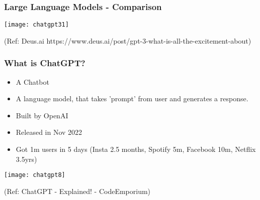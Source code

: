 



\begin{frame}[fragile]\frametitle{Large Language Models - Comparison}

\begin{center}
\texttt{[image: chatgpt31]}
\end{center}				
{\tiny (Ref: Deus.ai https://www.deus.ai/post/gpt-3-what-is-all-the-excitement-about)}

\end{frame}



\begin{frame}[fragile]\frametitle{What is ChatGPT?}


\begin{itemize}
\item A Chatbot
\item A language model, that takes 'prompt' from user and generates a response.
\item Built by OpenAI
\item Released in Nov 2022
\item Got 1m users in 5 days  (Insta 2.5 months, Spotify 5m, Facebook 10m, Netflix 3.5yrs)
\end{itemize}	 

\begin{center}
\texttt{[image: chatgpt8]}
\end{center}				
{\tiny (Ref: ChatGPT - Explained! - CodeEmporium)}
			
			
\end{frame}

